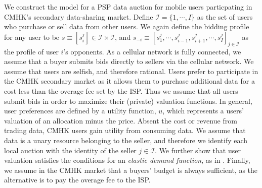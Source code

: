 \documentclass[12pt]{article}
\theoremstyle{definition}
\newcommand{\mcI}{\mathcal{I}}
\begin{document}
\begin{multicols}{2}
We construct the model for a PSP data auction for mobile users
particpating in CMHK's secondary data-sharing market.
Define $\mcI = \lbrace 1, \cdots, I\rbrace$ as the set of users who purchase or sell
data from other users. We again define the bidding profile for any user to be 
$s \equiv
[s_i^j] \in \mcI \times \mcI$, and $s_{-i} \equiv [s_1^j , \cdots , s_{i-1}^j , s_{i+1}^j , \cdots
, s_I^j]_{j\in\mcI}$ as the profile of user $i$'s opponents. 
As a cellular network is fully connected, we assume that a buyer submits bids directly to sellers via the
cellular network. We assume that users are selfish, and therefore
rational. 
Users prefer to participate in the CMHK secondary market as it allows them to purchase
additional data for a cost less than the overage fee set by the ISP. 
Thus we assume that all users submit bids in order to maximize their
(private) valuation functions. 
In general, user preferences are defined by a utility function, $u$, which 
represents a users' valuation of an allocation minus the price.
Absent the cost or revenue from trading data, CMHK users gain utility from consuming
data. 
We assume that data is a unary resource belonging to the seller, and
therefore we identify each local auction with the identity of the seller
$j\in\mcI$.
We further show that user valuation satisfies the conditions for an
\emph{elastic demand function}, as in \cite{lazar}.
Finally, we assume in the CMHK market that a buyers' budget is always
sufficient, as the alternative is to pay the overage fee to the ISP.


\end{multicols}
\end{document}
